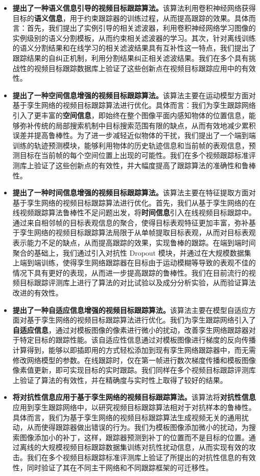 \begin{itemize}
\item{\textbf{提出了一种语义信息引导的视频目标跟踪算法。}该算法利用卷积神经网络获得目标的\textbf{语义信息}，用于约束跟踪器的训练过程，从而提高跟踪的效果。具体而言：首先，我们提出了实例引导的相关滤波器，利用卷积神经网络学习图像的实例级别的语义分割模板，从而约束相关滤波器的学习。其次，针对离线训练的语义分割结果和在线学习的相关滤波结果具有互补性这一特点，我们提出了跟踪结果的自纠正机制，利用分割结果纠正相关滤波结果。我们在多个具有挑战性的视频目标跟踪数据库上验证了这些创新点在视频目标跟踪应用中的有效性。}
\item{\textbf{提出了一种空间信息增强的视频目标跟踪算法。}该算法主要在运动模型方面对基于孪生网络的视频目标跟踪算法进行优化。具体而言：我们为孪生跟踪网络引入了更丰富的\textbf{空间信息}，即始终在整个图像平面内感知物体的位置信息，能够弥补传统的局部搜索机制中目标搜索范围有限的缺点，从而有效地减少累积误差并提高鲁棒性。为了进一步减轻近似物体的干扰，我们提出了一个端到端训练的轨迹预测模块，能够利用物体的历史轨迹信息和当前帧的表观信息，预测目标在当前帧的每个空间位置上出现的可能性。我们在多个视频跟踪标准评测库上验证了这些创新点的有效性，并大幅度提高了跟踪算法的准确性和鲁棒性。}
\item{\textbf{提出了一种时间信息增强的视频目标跟踪算法。}该算法主要在特征提取方面对基于孪生网络的视频目标跟踪算法进行优化。首先，我们从基于孪生网络的在线视频跟踪算法鲁棒性不足问题出发，将\textbf{时间信息}引入在线视频目标跟踪中。通过来自相邻帧的目标表观信息的聚合，使得目标表观特征更加丰富，弥补基于孪生网络的视频目标跟踪算法局限于从单帧提取目标表观，从而对目标表观表示能力不足的缺点，从而提高跟踪的效果，实现鲁棒的跟踪。在端到端时间聚合的基础上，我们通过引入对抗性 Dropout 模块，并通过在大规模数据集上端到端训练，使得孪生网络跟踪器在目标由于运动模糊等导致的表观不佳的情况下具有更好的表现，从而进一步提高跟踪的鲁棒性。我们在目前流行的视频目标跟踪评测库上进行了算法的对比试验以及成分分析实验，从而验证算法改进的有效性。}
\item{\textbf{提出了一种自适应信息增强的视频目标跟踪算法。}该算法主要在模型自适应方面对基于孪生网络的视频目标跟踪算法进行优化。我们为孪生跟踪网络引入了\textbf{自适应信息}，通过对模板图像的像素进行微小的扰动，改善孪生网络跟踪器对于特定目标的跟踪性能。该自适应性信息通过对模板图像进行梯度的反向传播计算得到，能够以即插即用的方式轻松添加到现有孪生网络跟踪器中，而无需修改网络模型的参数。在线跟踪时，仅在第一帧进行数次梯度传播和模板图像像素值更新，即可实现目标的实时跟踪。我们同样在多个视频目标跟踪评测库上验证了算法的有效性，并在精确度与实时性上取得了较好的结果。}
\item{\textbf{将对抗性信息应用于基于孪生网络的视频目标跟踪算法。}该算法将\textbf{对抗性信息}应用到孪生跟踪网络中，以研究视频目标跟踪算法相对于对抗样本的鲁棒性。具体而言，我们为基于孪生网络的视频目标跟踪算法生成视频无关的通用扰动，从而使得跟踪器做出错误的行为。我们为模板图像添加微小的扰动，为搜索图像添加小的补丁，这样，跟踪器预测到补丁的位置而不是目标的位置。通过离线的大规模视频目标跟踪数据集训练对抗性扰动信息，从而实现有效的攻击。我们在多个视频目标跟踪标准评测库上验证了所提出的对抗性信息的有效性，同时验证了其在不同主干网络和不同跟踪框架的可迁移性。}
\end{itemize}

